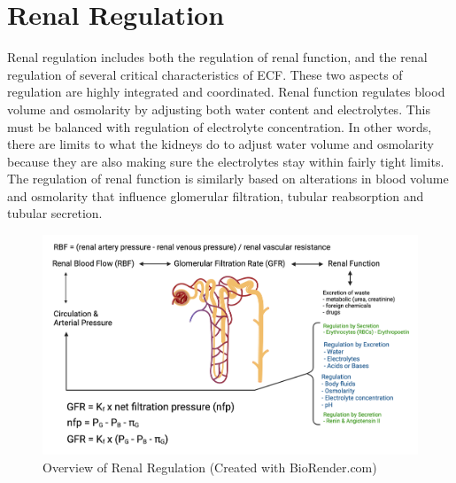 \section{Renal Regulation}

Renal regulation includes both the regulation of renal function, and the renal regulation of several critical characteristics of ECF. These two aspects of regulation are highly integrated and coordinated. Renal function regulates blood volume and osmolarity by adjusting both water content and electrolytes. This must be balanced with regulation of electrolyte concentration. In other words, there are limits to what the kidneys do to adjust water volume and osmolarity because they are also making sure the electrolytes stay within fairly tight limits. The regulation of renal function is similarly based on alterations in blood volume and osmolarity that influence glomerular filtration, tubular reabsorption and tubular secretion. 

\begin{figure}[!h]
    \centering
    \includegraphics[width=1\linewidth]{./figure/renal_regulation_intro.png}
    \caption{Overview of Renal Regulation \footnotesize{(Created with BioRender.com)}}
    \label{fig:renal_regulation_intro}
\end{figure}



